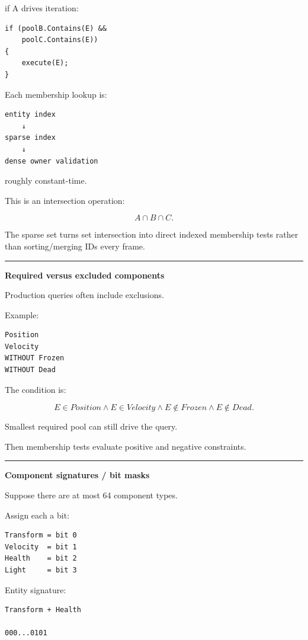 if A drives iteration:

\begin{verbatim}
if (poolB.Contains(E) &&
    poolC.Contains(E))
{
    execute(E);
}
\end{verbatim}

Each membership lookup is:

\begin{verbatim}
entity index
    ↓
sparse index
    ↓
dense owner validation
\end{verbatim}

roughly constant-time.

This is an intersection operation:

\[
A\cap B\cap C.
\]

The sparse set turns set intersection into direct indexed membership tests rather than sorting/merging IDs every frame.

\begin{center}\rule{0.5\linewidth}{0.5pt}\end{center}

\textbf{Required versus excluded components}

Production queries often include exclusions.

Example:

\begin{verbatim}
Position
Velocity
WITHOUT Frozen
WITHOUT Dead
\end{verbatim}

The condition is:

\[
E\in Position
\land
E\in Velocity
\land
E\notin Frozen
\land
E\notin Dead.
\]

Smallest required pool can still drive the query.

Then membership tests evaluate positive and negative constraints.

\begin{center}\rule{0.5\linewidth}{0.5pt}\end{center}

\textbf{Component signatures / bit masks}

Suppose there are at most 64 component types.

Assign each a bit:

\begin{verbatim}
Transform = bit 0
Velocity  = bit 1
Health    = bit 2
Light     = bit 3
\end{verbatim}

Entity signature:

\begin{verbatim}
Transform + Health

000...0101
\end{verbatim}

